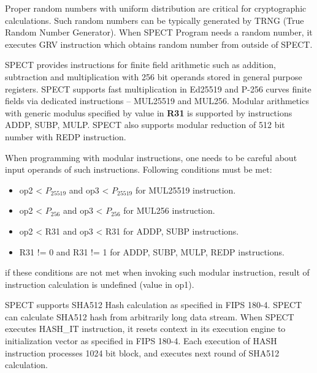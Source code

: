 \documentclass{tropic_design_spec}
\begin{document}

Proper random numbers with uniform distribution are critical for cryptographic
calculations. Such random numbers can be typically generated by TRNG (True Random
Number Generator). When SPECT Program needs a random number, it executes GRV
instruction which obtains random number from outside of SPECT.


SPECT provides instructions for finite field arithmetic such as
addition, subtraction and multiplication with 256 bit operands stored in general purpose
registers. SPECT supports fast multiplication in Ed25519 and P-256 curves finite fields 
via dedicated instructions -- MUL25519 and MUL256. Modular arithmetics with generic modulus
specified by value in \textbf{R31} is supported by instructions ADDP, SUBP, MULP. SPECT
also supports modular reduction of 512 bit number with REDP instruction.

When programming with modular instructions, one needs to be careful about input
operands of such instructions. Following conditions must be met:
\begin{itemize}
    \item op2 < $P_{25519}$ and op3 < $P_{25519}$ for MUL25519 instruction.
    \item op2 < $P_{256}$ and op3 < $P_{256}$ for MUL256 instruction.
    \item op2 < R31 and op3 < R31 for ADDP, SUBP instructions.
    \item R31 != 0 and R31 != 1 for ADDP, SUBP, MULP, REDP instructions.
\end{itemize}
if these conditions are not met when invoking such modular instruction, result
of instruction calculation is undefined (value in op1).



SPECT supports SHA512 Hash calculation as specified in FIPS 180-4. SPECT can
calculate SHA512 hash from arbitrarily long data stream. When SPECT executes HASH_IT
instruction, it resets context in its execution engine to initialization
vector as specified in FIPS 180-4. Each execution of HASH instruction
processes 1024 bit block, and executes next round of SHA512 calculation.

\end{document}
